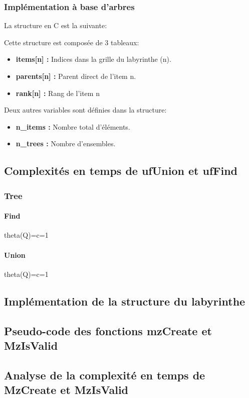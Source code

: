 \documentclass[11pt]{article}
\begin{document}
\subsubsection{Implémentation à base d'arbres}
La structure en C est la suivante:


Cette structure est composée de 3 tableaux:
\begin{itemize}
\item \textbf{items[n] :} Indices dans la grille du labyrinthe (n).
\item \textbf{parents[n] :} Parent direct de l'item n.
\item \textbf{rank[n] :} Rang de l'item n
\end{itemize}
Deux autres variables sont définies dans la structure:
\begin{itemize}
\item \textbf{n\_items :} Nombre total d'éléments.
\item \textbf{n\_trees :} Nombre d'ensembles.
\end{itemize}
	\subsection{Complexités en temps de ufUnion et ufFind}
		\subsubsection{Tree}
		\paragraph{Find}
		theta(Q)=c=1		
		\paragraph{Union}
		theta(Q)=c=1
	\subsection{Implémentation de la structure du labyrinthe}
	\subsection{Pseudo-code des fonctions mzCreate et MzIsValid}
	\subsection{Analyse de la complexité en temps de MzCreate et MzIsValid}
\end{document}
